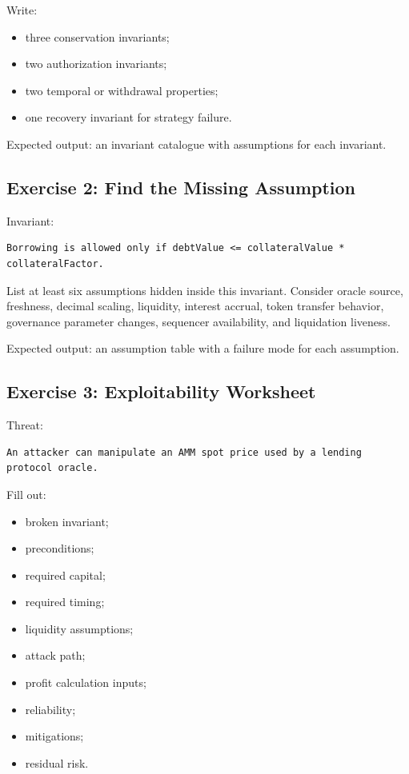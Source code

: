 Write:

\begin{itemize}
\tightlist
\item
  three conservation invariants;
\item
  two authorization invariants;
\item
  two temporal or withdrawal properties;
\item
  one recovery invariant for strategy failure.
\end{itemize}

Expected output: an invariant catalogue with assumptions for each invariant.

\subsection{Exercise 2: Find the Missing Assumption}

Invariant:

\begin{lstlisting}
Borrowing is allowed only if debtValue <= collateralValue * collateralFactor.
\end{lstlisting}

List at least six assumptions hidden inside this invariant. Consider oracle source, freshness, decimal scaling, liquidity, interest accrual, token transfer behavior, governance parameter changes, sequencer availability, and liquidation liveness.

Expected output: an assumption table with a failure mode for each assumption.

\subsection{Exercise 3: Exploitability Worksheet}

Threat:

\begin{lstlisting}
An attacker can manipulate an AMM spot price used by a lending protocol oracle.
\end{lstlisting}

Fill out:

\begin{itemize}
\tightlist
\item
  broken invariant;
\item
  preconditions;
\item
  required capital;
\item
  required timing;
\item
  liquidity assumptions;
\item
  attack path;
\item
  profit calculation inputs;
\item
  reliability;
\item
  mitigations;
\item
  residual risk.
\end{itemize}

